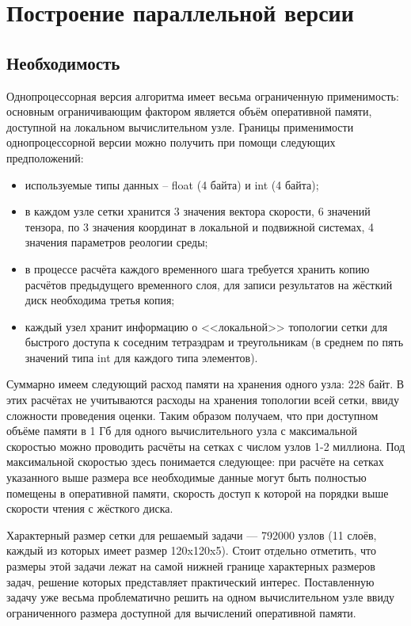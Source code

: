 \section{Построение параллельной версии}
\subsection{Необходимость}
Однопроцессорная версия алгоритма имеет весьма ограниченную применимость: основным ограничивающим фактором является объём оперативной памяти, доступной на локальном вычислительном узле. Границы применимости однопроцессорной версии можно получить при помощи следующих предположений:
\begin{itemize}
	\item используемые типы данных -- float (4 байта) и int (4 байта);
	\item в каждом узле сетки хранится 3 значения вектора скорости, 6 значений тензора, по 3 значения координат в локальной и подвижной системах, 4 значения параметров реологии среды;
	\item в процессе расчёта каждого временного шага требуется хранить копию расчётов предыдущего временного слоя, для записи результатов на жёсткий диск необходима третья копия;
	\item каждый узел хранит информацию о <<локальной>> топологии сетки для быстрого доступа к соседним тетраэдрам и треугольникам (в среднем по пять значений типа int для каждого типа элементов).
\end{itemize}

Суммарно имеем следующий расход памяти на хранения одного узла: 228 байт. В этих
расчётах не учитываются расходы на хранения топологии всей сетки, ввиду
сложности проведения оценки. Таким образом получаем, что при доступном объёме
памяти в 1 Гб для одного вычислительного узла с максимальной скоростью можно
проводить расчёты на сетках с числом узлов 1-2 миллиона. Под максимальной
скоростью здесь понимается следующее: при расчёте на сетках указанного выше
размера все необходимые данные могут быть полностью помещены в оперативной
памяти, скорость доступ к которой на порядки выше скорости чтения с жёсткого
диска.

Характерный размер сетки для решаемый задачи — 
792000 узлов (11 слоёв, каждый из которых имеет размер 120x120x5). Стоит
отдельно отметить, что размеры этой задачи лежат на самой нижней границе
характерных размеров задач, решение которых представляет практический интерес.
Поставленную задачу уже весьма проблематично решить на одном вычислительном узле
ввиду ограниченного размера доступной для вычислений оперативной памяти.


